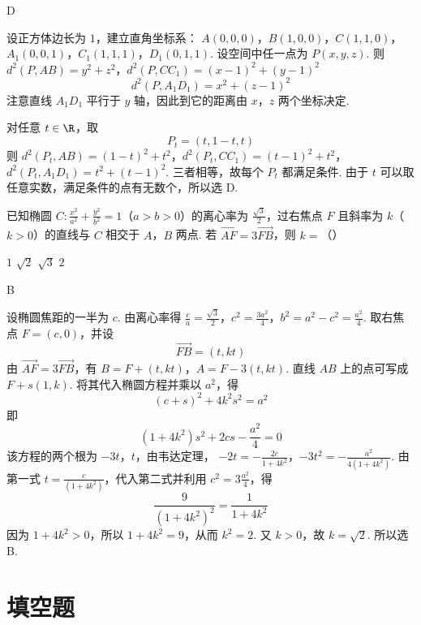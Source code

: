 \begin{answer}
D
\end{answer}

\begin{solution}
设正方体边长为 \(1\)，建立直角坐标系：
\(A(0,0,0)\)，\(B(1,0,0)\)，\(C(1,1,0)\)，\(A_1(0,0,1)\)，\(C_1(1,1,1)\)，\(D_1(0,1,1)\).
设空间中任一点为 \(P(x,y,z)\). 则
\(d^2(P,AB)=y^2+z^2\)，\(d^2(P,CC_1)=(x-1)^2+(y-1)^2\)
\[
d^2(P,A_1D_1)=x^2+(z-1)^2
\]
注意直线 \(A_1D_1\) 平行于 \(y\) 轴，因此到它的距离由 \(x\)，\(z\) 两个坐标决定.

对任意 \(t\in\R\)，取
\[
P_t=(t,1-t,t)
\]
则
\(d^2(P_t,AB)=(1-t)^2+t^2\)，\(d^2(P_t,CC_1)=(t-1)^2+t^2\)，\(d^2(P_t,A_1D_1)=t^2+(t-1)^2\).
三者相等，故每个 \(P_t\) 都满足条件. 由于 \(t\) 可以取任意实数，满足条件的点有无数个，所以选 D.
\end{solution}

\begin{problem}
已知椭圆 \(C: \frac{x^2}{a^2} + \frac{y^2}{b^2} = 1\)（\(a > b > 0\)）的离心率为 \(\frac{\sqrt{3}}{2}\)，过右焦点 \(F\) 且斜率为 \(k\)（\(k > 0\)）的直线与 \(C\) 相交于 \(A\)，\(B\) 两点. 若 \(\overrightarrow{AF} = 3\overrightarrow{FB}\)，则 \(k =\)（\quad）

\choices
    {\(1\)}
    {\(\sqrt{2}\)}
    {\(\sqrt{3}\)}
    {\(2\)}
\end{problem}

\begin{answer}
B
\end{answer}

\begin{solution}
设椭圆焦距的一半为 \(c\). 由离心率得
\(\frac{c}{a}=\frac{\sqrt3}{2}\)，\(c^2=\frac{3a^2}{4}\)，\(b^2=a^2-c^2=\frac{a^2}{4}\).
取右焦点 \(F=(c,0)\)，并设
\[
\overrightarrow{FB}=(t,kt)
\]
由 \(\overrightarrow{AF}=3\overrightarrow{FB}\)，有
\(B=F+(t,kt)\)，\(A=F-3(t,kt)\).
直线 \(AB\) 上的点可写成 \(F+s(1,k)\). 将其代入椭圆方程并乘以 \(a^2\)，得
\[
(c+s)^2+4k^2s^2=a^2
\]
即
\[
(1+4k^2)s^2+2cs-\frac{a^2}{4}=0
\]
该方程的两个根为 \(-3t\)，\(t\)，由韦达定理，
\(-2t=-\frac{2c}{1+4k^2}\)，\(-3t^2=-\frac{a^2}{4(1+4k^2)}\).
由第一式 \(t=\frac{c}{(1+4k^2)}\)，代入第二式并利用 \(c^2=3\frac{a^2}{4}\)，得
\[
\frac{9}{(1+4k^2)^2}=\frac{1}{1+4k^2}
\]
因为 \(1+4k^2>0\)，所以 \(1+4k^2=9\)，从而 \(k^2=2\). 又 \(k>0\)，故 \(k=\sqrt2\). 所以选 B.
\end{solution}

\section{填空题}

